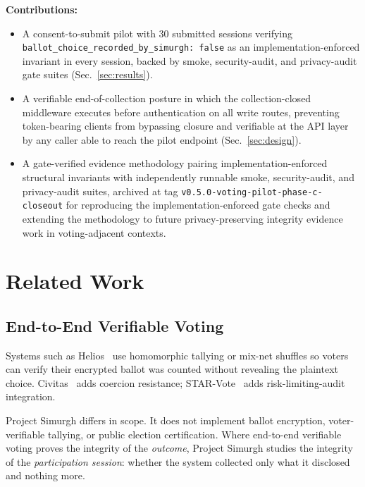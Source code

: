\documentclass[conference]{IEEEtran}
\newcommand{\sys}{Project Simurgh}
\begin{document}
\medskip
\noindent\textbf{Contributions:}
\begin{itemize}
  \item A consent-to-submit pilot with 30 submitted sessions verifying
    \texttt{ballot\_choice\_recorded\_by\_simurgh: false} as an
    implementation-enforced invariant in every session, backed by smoke,
    security-audit, and privacy-audit gate suites (Sec.~\ref{sec:results}).
  \item A verifiable end-of-collection posture in which the collection-closed
    middleware executes before authentication on all write routes, preventing
    token-bearing clients from bypassing closure and verifiable at the API
    layer by any caller able to reach the pilot endpoint
    (Sec.~\ref{sec:design}).
  \item A gate-verified evidence methodology pairing implementation-enforced
    structural invariants with independently runnable smoke, security-audit,
    and privacy-audit suites, archived at tag
    \texttt{v0.5.0-voting-pilot-phase-c-closeout} for reproducing the
    implementation-enforced gate checks and extending the methodology to future
    privacy-preserving integrity evidence work in voting-adjacent contexts.
\end{itemize}

\section{Related Work}

\subsection{End-to-End Verifiable Voting}

Systems such as Helios~\cite{adida2008helios} use homomorphic tallying or
mix-net shuffles so voters can verify their encrypted ballot was counted without
revealing the plaintext choice. Civitas~\cite{clarkson2008civitas} adds
coercion resistance; STAR-Vote~\cite{bell2013starvote} adds risk-limiting-audit
integration.

\sys{} differs in scope. It does not implement ballot encryption,
voter-verifiable tallying, or public election certification. Where end-to-end
verifiable voting proves the integrity of the \emph{outcome}, \sys{} studies
the integrity of the \emph{participation session}: whether the system collected
only what it disclosed and nothing more.
\end{document}
